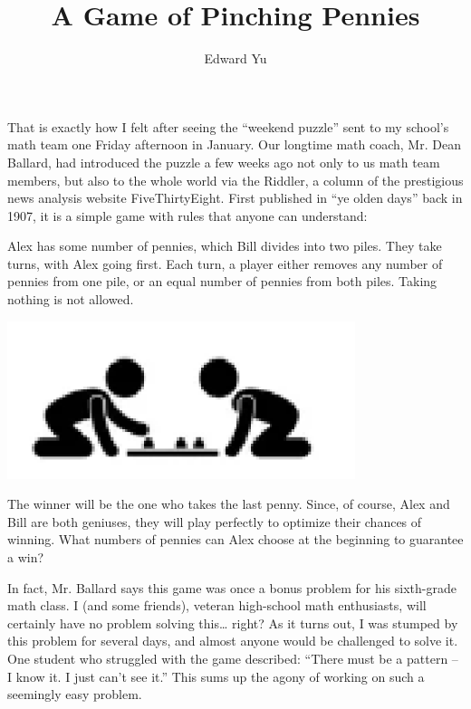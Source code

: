 \documentclass{article}
\title{A Game of Pinching Pennies}
\author{Edward Yu}
\begin{document}
\maketitle

That is exactly how I felt after seeing the “weekend puzzle” sent to my school’s math team one Friday afternoon in January. Our longtime math coach, Mr. Dean Ballard, had introduced the puzzle a few weeks ago not only to us math team members, but also to the whole world via the Riddler, a column of the prestigious news analysis website FiveThirtyEight. First published in ``ye olden days'' back in 1907, it is a simple game with rules that anyone can understand:

Alex has some number of pennies, which Bill divides into two piles. They take turns, with Alex going first. Each turn, a player either removes any number of pennies from one pile, or an equal number of pennies from both piles. Taking nothing is not allowed.

\begin{center}
     \includegraphics[width=4in]{images/play_game.png}
\end{center}

The winner will be the one who takes the last penny. Since, of course, Alex and Bill are both geniuses, they will play perfectly to optimize their chances of winning. What numbers of pennies can Alex choose at the beginning to guarantee a win?


In fact, Mr. Ballard says this game was once a bonus problem for his sixth-grade math class. I (and some friends), veteran high-school math enthusiasts, will certainly have no problem solving this… right? As it turns out, I was stumped by this problem for several days, and almost anyone would be challenged to solve it. One student who struggled with the game described: “There must be a pattern – I know it. I just can’t see it.” This sums up the agony of working on such a seemingly easy problem.
\end{document}
